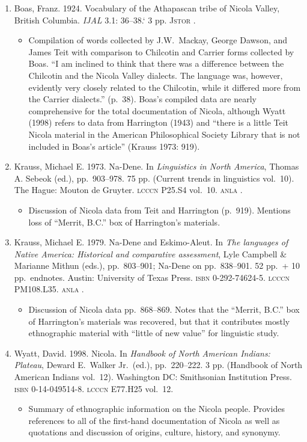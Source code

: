 \documentclass[12pt,letterpaper,oneside,article]{memoir}
\begin{document}
\begin{enumerate}
\item	Boas, Franz.
	1924.
	Vocabulary of the Athapascan tribe of Nicola Valley, British Columbia.
	\textit{IJAL} 3.1: 36–38.`
	3 pp.
	\textsc{Jstor} .
	\begin{itemize}
	\item	Compilation of words collected by J.W.\ Mackay, George Dawson, and James Teit
		with comparison to Chilcotin and Carrier forms collected by Boas.
		“I am inclined to think that there was a difference between the Chilcotin and
		the Nicola Valley dialects. The language was, however, evidently very closely
		related to the Chilcotin, while it differed more from the Carrier dialects.”
		(p.\ 38).
		Boas’s compiled data are nearly comprehensive for the total documentation
		of Nicola, although Wyatt (1998) refers to data from Harrington (1943) and
		“there is a little Teit Nicola material in the American Philosophical Society
		Library that is not included in Boas’s article” (Krauss 1973: 919).
	\end{itemize}
\item	Krauss, Michael E.
	1973.
	Na-Dene.
	In \textit{Linguistics in North America},
	Thomas A. Sebeok (ed.), pp.\ 903–978.
	75 pp.
	(Current trends in linguistics vol.\ 10).
	The Hague: Mouton de Gruyter.
	\textsc{lcccn} P25.S4 vol.\ 10.
	\textsc{anla} .
	\begin{itemize}
	\item	Discussion of Nicola data from Teit and Harrington (p.\ 919).
		Mentions loss of “Merrit, B.C.” box of Harrington’s materials.
	\end{itemize}
\item	Krauss, Michael E.
	1979.
	Na-Dene and Eskimo-Aleut.
	In \textit{The languages of Native America: Historical and comparative assessment},
	Lyle Campbell \& Marianne Mithun (eds.), pp.\ 803–901;
	Na-Dene on pp.\ 838–901.
	52 pp.\ + 10 pp.\ endnotes.
	Austin: University of Texas Press.
	\textsc{isbn} 0-292-74624-5.
	\textsc{lcccn} PM108.L35.
	\textsc{anla} .
	\begin{itemize}
	\item	Discussion of Nicola data pp.\ 868–869.
		Notes that the “Merrit, B.C.” box of Harrington’s materials was recovered,
		but that it contributes mostly ethnographic material with “little of new value”
		for linguistic study.
	\end{itemize}
\item	Wyatt, David.
	1998.
	Nicola.
	In \textit{Handbook of North American Indians: Plateau}, Deward E.\ Walker Jr.\ (ed.),
	pp.\ 220–222.
	3 pp.
	(Handbook of North American Indians vol.\ 12).
	Washington DC: Smithsonian Institution Press.
	\textsc{isbn} 0-14-049514-8.
	\textsc{lcccn} E77.H25 vol.\ 12.
	\begin{itemize}
	\item	Summary of ethnographic information on the Nicola people.
		Provides references to all of the first-hand documentation of Nicola as well
		as quotations and discussion of origins, culture, history, and synonymy.
	\end{itemize}
\end{enumerate}
\end{document}
